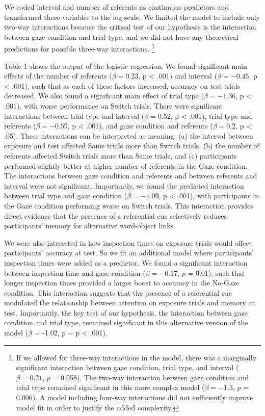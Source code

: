 \documentclass[authoryear, review]{elsarticle}
\begin{document}
We coded interval and number of referents as continuous predictors and
transformed these variables to the log scale. We limited the model to
include only two-way interactions because the critical test of our
hypothesis is the interaction between gaze condition and trial type, and
we did not have any theoretical predictions for possible three-way
interactions.
\footnote{If we allowed for three-way interactions in the model, there was a marginally significant interaction between gaze condition, trial type, and interval ($\beta = 0.21$, $p$ = 0.058). The two-way interaction between gaze condition and trial type remained significant in this more complex model ($\beta = -1.3$, $p$ = 0.006). A model including four-way interactions did not sufficiently improve model fit in order to justify the added complexity.}

Table 1 shows the output of the logistic regression. We found
significant main effects of the number of referents (\(\beta = 0.23\), p
\textless{} .001) and interval (\(\beta = -0.45\), p \textless{} .001),
such that as each of these factors increased, accuracy on test trials
decreased. We also found a significant main effect of trial type
(\(\beta = -1.36\), p \textless{} .001), with worse performance on
Switch trials. There were significant interactions between trial type
and interval (\(\beta = 0.52\), p \textless{} .001), trial type and
referents (\(\beta = -0.59\), p \textless{} .001), and gaze condition
and referents (\(\beta = 0.2\), p \textless{} .05). These interactions
can be interpreted as meaning: (a) the interval between exposure and
test affected Same trials more than Switch trials, (b) the number of
referents affected Switch trials more than Same trials, and (c)
participants performed slightly better at higher number of referents in
the Gaze condition. The interactions between gaze condition and
referents and between referents and interval were not significant.
Importantly, we found the predicted interaction between trial type and
gaze condition (\(\beta = -1.09\), p \textless{} .001), with
participants in the Gaze condition performing worse on Switch trials.
This interaction provides direct evidence that the presence of a
referential cue selectively reduces participants' memory for alternative
word-object links.

We were also interested in how inspection times on exposure trials would
affect participants' accuracy at test. So we fit an additional model
where participants' inspection times were added as a predictor. We found
a significant interaction between inspection time and gaze condition
(\(\beta = -0.17\), \(p\) = 0.01), such that longer inspection times
provided a larger boost to accuracy in the No-Gaze condition. This
interaction suggests that the presence of a referential cue modulated
the relationship between attention on exposure trials and memory at
test. Importantly, the key test of our hypothesis, the interaction
between gaze condition and trial type, remained significant in this
alternative version of the model (\(\beta\) = -1.02, \(p\) = p
\textless{} .001).
\end{document}
